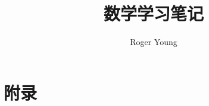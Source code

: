 \documentclass{ctexbook}
\newcommand{\documentTitle}
    {\texorpdfstring{数学学习笔记}{数学学习笔记}}
\newcommand{\documentAuthor}{Roger Young}
\begin{document}
\title{\documentTitle}
\author{\documentAuthor}

\maketitle
\tableofcontents





































\chapter*{附录}
\printindex
\printglossaries
\end{document}
